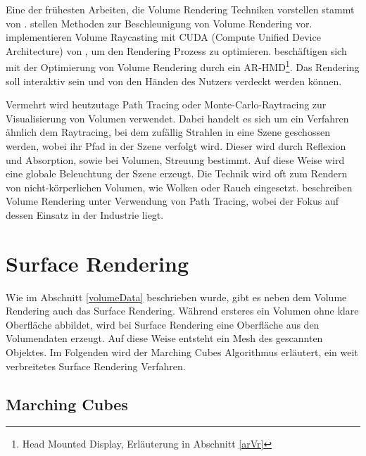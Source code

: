 Eine der frühesten Arbeiten, die Volume Rendering Techniken vorstellen stammt von \cite{Drebin88}.
\cite{Kruger03} stellen Methoden zur Beschleunigung von Volume Rendering vor.
\cite{Marsalek08} implementieren Volume Raycasting mit CUDA (Compute Unified Device Architecture) von \cite{cuda}, um den Rendering Prozess zu optimieren.
\cite{Kutter08} beschäftigen sich mit der Optimierung von Volume Rendering durch ein AR-HMD\footnote{Head Mounted Display, Erläuterung in Abschnitt \ref{arVr}}. Das Rendering soll interaktiv sein und von den Händen des Nutzers verdeckt werden können.

Vermehrt wird heutzutage Path Tracing oder Monte-Carlo-Raytracing zur Visualisierung von Volumen verwendet. Dabei handelt es sich um ein Verfahren ähnlich dem Raytracing, bei dem zufällig Strahlen in eine Szene geschossen werden, wobei ihr Pfad in der Szene verfolgt wird. Dieser wird durch Reflexion und Absorption, sowie bei Volumen, Streuung bestimmt. Auf diese Weise wird eine globale Beleuchtung der Szene erzeugt. Die Technik wird oft zum Rendern von nicht-körperlichen Volumen, wie Wolken oder Rauch eingesetzt. 
\cite{Fong17} beschreiben Volume Rendering unter Verwendung von Path Tracing, wobei der Fokus auf dessen Einsatz in der Industrie liegt.

\section{Surface Rendering}		 %

Wie im Abschnitt \ref{volumeData} beschrieben wurde, gibt es neben dem Volume Rendering auch das Surface Rendering. Während ersteres ein Volumen ohne klare Oberfläche abbildet, wird bei Surface Rendering eine Oberfläche aus den Volumendaten erzeugt. Auf diese Weise entsteht ein Mesh des gescannten Objektes.
Im Folgenden wird der Marching Cubes Algorithmus erläutert, ein weit verbreitetes Surface Rendering Verfahren.



\subsection{Marching Cubes}
\label{marchingCubes}

